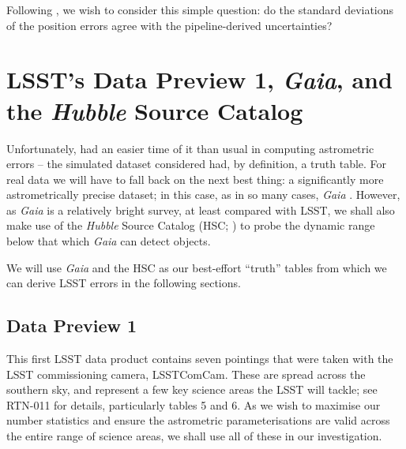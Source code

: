 \documentclass[SE,lsstdraft,authoryear,toc]{lsstdoc}
\begin{document}
Following \citet{sitcomtn-159}, we wish to consider this simple question: do the standard deviations of the position errors agree with the pipeline-derived uncertainties?

\section{LSST's Data Preview 1, \textit{Gaia}, and the \textit{Hubble} Source Catalog}
Unfortunately, \citet{sitcomtn-159} had an easier time of it than usual in computing astrometric errors -- the simulated dataset considered had, by definition, a truth table.
For real data we will have to fall back on the next best thing: a significantly more astrometrically precise dataset; in this case, as in so many cases, \textit{Gaia} \citep{Collaboration2021}.
However, as \textit{Gaia} is a relatively bright survey, at least compared with LSST, we shall also make use of the \textit{Hubble} Source Catalog (HSC; \citealp{Whitmore2016}) to probe the dynamic range below that which \textit{Gaia} can detect objects.

We will use \textit{Gaia} and the HSC as our best-effort ``truth'' tables from which we can derive LSST errors in the following sections.

\subsection{Data Preview 1}
This first LSST data product contains seven pointings that were taken with the LSST commissioning camera, LSSTComCam.
These are spread across the southern sky, and represent a few key science areas the LSST will tackle; see RTN-011 \citep{Guy2025} for details, particularly tables 5 and 6.
As we wish to maximise our number statistics and ensure the astrometric parameterisations are valid across the entire range of science areas, we shall use all of these in our investigation.
\end{document}
